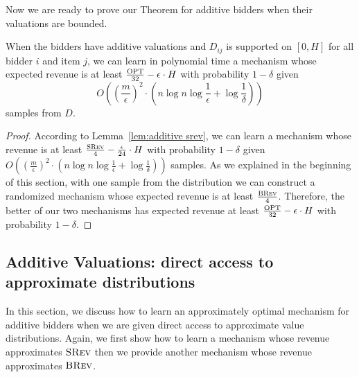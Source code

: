 Now we are ready to prove our Theorem for additive bidders when their valuations are bounded.
\begin{theorem}\label{thm:additive bounded}
	When the bidders have additive valuations and $D_{ij}$ is supported on $[0,H]$ for all bidder $i$ and item $j$, we can learn in polynomial time a mechanism whose expected revenue is at least $\frac{\text{OPT}}{32}-{\epsilon}\cdot H$ with probability $1-\delta$ given $$O\left(\left(\frac{m}{\epsilon}\right)^2 \cdot\left(n\log n\log \frac{1}{\epsilon}+\log\frac{1}{\delta} \right)\right)$$ samples from $D$. 
\end{theorem}
\begin{proof}
	According to Lemma~\ref{lem:additive srev}, we can learn a mechanism whose revenue is at least $\frac{\textsc{SRev}}{4}-\frac{\epsilon}{24}\cdot H$ with probability $1-\delta$ given $O\left(\left(\frac{m}{\epsilon}\right)^2\cdot \left(n\log n\log \frac{1}{\epsilon}+\log\frac{1}{\delta} \right)\right)$ samples. As we explained in the beginning of this section, with one sample from the distribution we can construct a randomized mechanism whose expected revenue is at least $\frac{\textsc{BRev}}{4}$. Therefore, the better of our two mechanisms has expected revenue at least $\frac{\text{OPT}}{32}-{\epsilon}\cdot H$ with probability $1-\delta$.
	\end{proof}
	
\subsection{Additive Valuations: direct access to approximate distributions}\label{sec:additive Kolmogorov}
	
In this section, we discuss how to learn an approximately optimal mechanism for additive bidders when we are given direct access to approximate value distributions. Again, we first show how to learn a mechanism whose revenue approximates $\textsc{SRev}$ then we provide another mechanism whose revenue approximates $\textsc{BRev}$.

